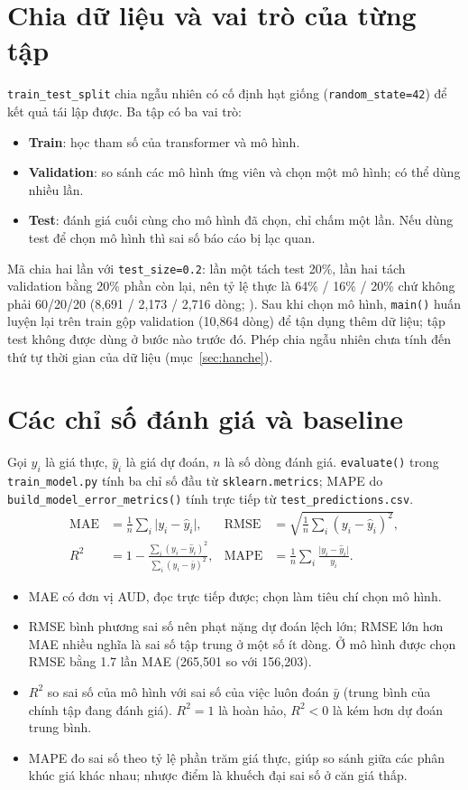 \section{Chia dữ liệu và vai trò của từng tập}\label{sec:chiatap}
\texttt{train\_test\_split} chia ngẫu nhiên có cố định hạt giống (\texttt{random\_state=42}) để kết quả tái lập được. Ba tập có ba vai trò:
\begin{itemize}[nosep]
  \item \textbf{Train}: học tham số của transformer và mô hình.
  \item \textbf{Validation}: so sánh các mô hình ứng viên và chọn một mô hình; có thể dùng nhiều lần.
  \item \textbf{Test}: đánh giá cuối cùng cho mô hình đã chọn, chỉ chấm một lần. Nếu dùng test để chọn mô hình thì sai số báo cáo bị lạc quan.
\end{itemize}
Mã chia hai lần với \texttt{test\_size=0.2}: lần một tách test 20\%, lần hai tách validation bằng 20\% phần còn lại, nên tỷ lệ thực là 64\% / 16\% / 20\% chứ không phải 60/20/20 (8,691 / 2,173 / 2,716 dòng; ). Sau khi chọn mô hình, \texttt{main()} huấn luyện lại trên train gộp validation (10,864 dòng) để tận dụng thêm dữ liệu; tập test không được dùng ở bước nào trước đó. Phép chia ngẫu nhiên chưa tính đến thứ tự thời gian của dữ liệu (mục~\ref{sec:hanche}).

\section{Các chỉ số đánh giá và baseline}\label{sec:chiso}
Gọi $y_i$ là giá thực, $\hat{y}_i$ là giá dự đoán, $n$ là số dòng đánh giá. \texttt{evaluate()} trong \texttt{train\_model.py} tính ba chỉ số đầu từ \texttt{sklearn.metrics}; MAPE do \texttt{build\_model\_error\_metrics()} tính trực tiếp từ \texttt{test\_predictions.csv}.
\begin{align*}
\mathrm{MAE} &= \frac{1}{n}\sum_i \lvert y_i-\hat{y}_i\rvert, &
\mathrm{RMSE} &= \sqrt{\frac{1}{n}\sum_i (y_i-\hat{y}_i)^2},\\
R^2 &= 1-\frac{\sum_i (y_i-\hat{y}_i)^2}{\sum_i (y_i-\bar{y})^2}, &
\mathrm{MAPE} &= \frac{1}{n}\sum_i \frac{\lvert y_i-\hat{y}_i\rvert}{y_i}.
\end{align*}
\begin{itemize}[nosep]
  \item MAE có đơn vị AUD, đọc trực tiếp được; chọn làm tiêu chí chọn mô hình.
  \item RMSE bình phương sai số nên phạt nặng dự đoán lệch lớn; RMSE lớn hơn MAE nhiều nghĩa là sai số tập trung ở một số ít dòng. Ở mô hình được chọn RMSE bằng 1.7 lần MAE (265,501 so với 156,203).
  \item $R^2$ so sai số của mô hình với sai số của việc luôn đoán $\bar{y}$ (trung bình của chính tập đang đánh giá). $R^2 = 1$ là hoàn hảo, $R^2 < 0$ là kém hơn dự đoán trung bình.
  \item MAPE đo sai số theo tỷ lệ phần trăm giá thực, giúp so sánh giữa các phân khúc giá khác nhau; nhược điểm là khuếch đại sai số ở căn giá thấp.
\end{itemize}

